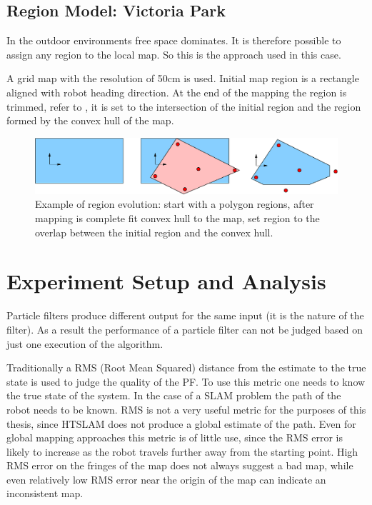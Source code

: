 \subsection{Region Model: Victoria Park}

In the outdoor environments free space dominates. It is therefore
possible to assign any region to the local map. So this is the
approach used in this case.

A grid map with the resolution of 50cm is used. Initial map region is
a rectangle aligned with robot heading direction. At the end of the
mapping the region is trimmed, refer to
, it is set to the intersection
of the initial region and the region formed by the convex hull of the
map.

\begin{figure}[htbp]
  \centering
  \includegraphics[width=14cm]{Pics/fig_convex_reg}
  \caption[Example of region evolution]
  {Example of region evolution: start with a polygon regions,
  after mapping is complete fit convex hull to the map, set region to
  the overlap between the initial region and the convex hull.}
  \label{fig:initial_region_vision}
\end{figure}

\section{Experiment Setup and Analysis}

Particle filters produce different output for the same input (it is
the nature of the filter). As a result the performance of a particle
filter can not be judged based on just one execution of the
algorithm. 


Traditionally a RMS (Root Mean Squared) distance from the estimate to
the true state is used to judge the quality of the PF. To use this
metric one needs to know the true state of the system. In the case of
a SLAM problem the path of the robot needs to be known. RMS is not a
very useful metric for the purposes of this thesis, since HTSLAM does
not produce a global estimate of the path. Even for global mapping
approaches this metric is of little use, since the RMS error is likely
to increase as the robot travels further away from the starting point.
High RMS error on the fringes of the map does not always suggest a bad
map, while even relatively low RMS error near the origin of the map
can indicate an inconsistent map.

